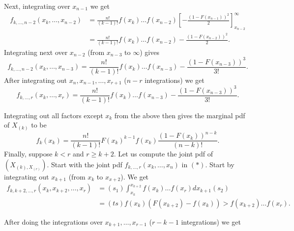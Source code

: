 Next, integrating over $x_{n - 1}$ we get 
\begin{align*}
	f_{k, \ldots, n - 2}\left( x_{k} , \ldots , x_{n - 2} \right) &= \frac{n!}{\left( k - 1 \right) !} f\left( x_{k } \right) \ldots f \left( x _{n - 2} \right) \left[ - \frac{\left( 1 - F\left( x_{n -1} \right)  \right) ^2}{2} \right] ^{\infty}_{x _{n -2}}\\
								      &= \frac{n!}{\left( k - 1 \right) !} f\left( x_{k} \right) \ldots f \left( x_{n - 2} \right)  - \frac{\left( 1 - F\left( x_{n -2} \right)  \right) ^2}{2}
.\end{align*}
Integrating next over $x_{n - 2}$ (from $x_{n - 3}$ to $\infty$) gives 
\[
		f_{k, \ldots, n - 2}\left( x_{k} , \ldots , x_{n - 3} \right)=    \frac{n!}{\left( k - 1 \right) !} f\left( x_{k} \right) \ldots f \left( x_{n - 3} \right)  - \frac{\left( 1 - F\left( x_{n -3} \right)  \right) ^3}{3!}
.\] 
After integrating out $x_{n}, x_{n-1} , \ldots ,  x_{r+1}$ ($n - r$ integrations) we get 
\[
		f_{k, \ldots, r}\left( x_{k} , \ldots , x_{r} \right)=    \frac{n!}{\left( k - 1 \right) !} f\left( x_{k} \right) \ldots f \left( x_{n - 3} \right)  - \frac{\left( 1 - F\left( x_{n -3} \right)  \right) ^3}{3!}
.\] 


Integrating out all factors except $x_{k}$ from the above then gives the marginal pdf of $X_{\left( k \right) }$ to be 
\[
	f_{k}\left( x_k \right) = \frac{n!}{\left( k - 1 \right) !} F\left( x_{k} \right) ^{k - 1}f\left( x_{k} \right) \frac{\left( 1 - F\left( x_{k} \right)  \right) ^{n - k}}{\left( n - k \right) !}
.\] 
Finally, suppose $k < r$ and $r \ge  k + 2$. Let us compute the joint pdf of $\left( X_{\left( k \right) , X_{\left( r \right) }} \right) $. Start with the joint pdf $f_{k , \ldots, r}\left( x_{k} , \ldots , x_{n} \right) $ in $\left( * \right) $. Start by integrating out $x_{k + 1}$ (from $x_k$ to $x_{x + 2}$). We get 
\begin{align*}
	f_{k, k + 2, \ldots, r }\left( x_k, x_{k + 2}, \ldots, x _{r} \right) &= \left( s_1 \right) \int_{x_k}^{x_{k + 2}} f\left( x_k \right) \ldots f\left( x_r \right) dx_{k + 1} \left( s_2 \right) \\ 
									      &= \left( ts \right) f\left( x_k \right) \left( F\left( x_{k + 2} \right) - f\left( x_k \right)  \right) > f\left( x _{k + 2} \right) \ldots f \left( x_{r} \right)  
.\end{align*}

After doing the integrations over $x_{k+1} , \ldots , x_{r-1}$ ($r - k - 1$ integrations) we get 
